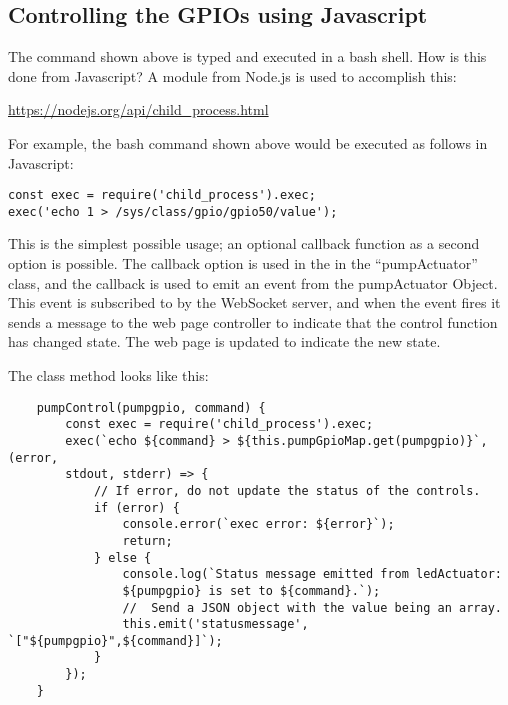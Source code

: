 \subsection{Controlling the GPIOs using Javascript}

The command shown above is typed and executed in a bash shell.  How is this 
done from Javascript?  A module from Node.js is used to accomplish this:

\url{https://nodejs.org/api/child_process.html}

For example, the bash command shown above would be executed as follows in 
Javascript:

\begin{verbatim}
const exec = require('child_process').exec;
exec('echo 1 > /sys/class/gpio/gpio50/value');
\end{verbatim}

This is the simplest possible usage; an optional callback function as a second 
option is possible.  The callback option is used in the in the ``pumpActuator'' 
class, and the callback is used to emit an event from the pumpActuator Object.  
This event is subscribed to by the WebSocket server, and when the event fires 
it sends a message to the web page controller to indicate that the control 
function has changed state.  The web page is updated to indicate the new state.

The class method looks like this:

\begin{verbatim}
    pumpControl(pumpgpio, command) {
        const exec = require('child_process').exec;
        exec(`echo ${command} > ${this.pumpGpioMap.get(pumpgpio)}`, (error, 
        stdout, stderr) => {
            // If error, do not update the status of the controls.
            if (error) {
                console.error(`exec error: ${error}`);
                return;
            } else {
                console.log(`Status message emitted from ledActuator: 
                ${pumpgpio} is set to ${command}.`);
                //  Send a JSON object with the value being an array.
                this.emit('statusmessage', `["${pumpgpio}",${command}]`);
            }
        });
    }
\end{verbatim}







